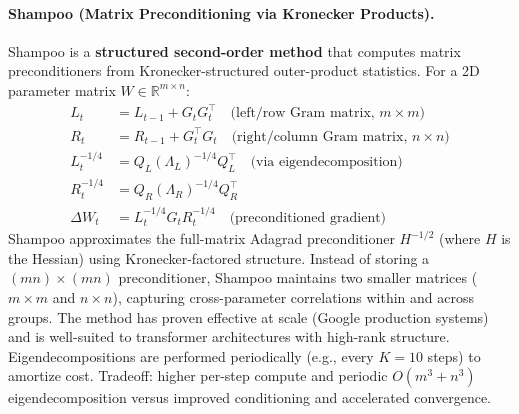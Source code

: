 \documentclass[11pt,a4paper]{article}
\begin{document}
\paragraph{Shampoo (Matrix Preconditioning via Kronecker Products).}
Shampoo is a \textbf{structured second-order method} that computes matrix preconditioners from Kronecker-structured outer-product statistics. For a 2D parameter matrix $W \in \mathbb{R}^{m \times n}$:
\begin{align}
L_t &= L_{t-1} + G_t G_t^\top \quad\text{(left/row Gram matrix, $m \times m$)} \\
R_t &= R_{t-1} + G_t^\top G_t \quad\text{(right/column Gram matrix, $n \times n$)} \\
L_t^{-1/4} &= Q_L (\Lambda_L)^{-1/4} Q_L^\top \quad\text{(via eigendecomposition)} \\
R_t^{-1/4} &= Q_R (\Lambda_R)^{-1/4} Q_R^\top \\
\Delta W_t &= L_t^{-1/4} G_t R_t^{-1/4} \quad\text{(preconditioned gradient)}
\end{align}
Shampoo approximates the full-matrix Adagrad preconditioner $H^{-1/2}$ (where $H$ is the Hessian) using Kronecker-factored structure. Instead of storing a $(mn) \times (mn)$ preconditioner, Shampoo maintains two smaller matrices ($m \times m$ and $n \times n$), capturing cross-parameter correlations within and across groups. The method has proven effective at scale (Google production systems) and is well-suited to transformer architectures with high-rank structure. Eigendecompositions are performed periodically (e.g., every $K=10$ steps) to amortize cost. Tradeoff: higher per-step compute and periodic $O(m^3 + n^3)$ eigendecomposition versus  improved conditioning and accelerated convergence.
\end{document}
